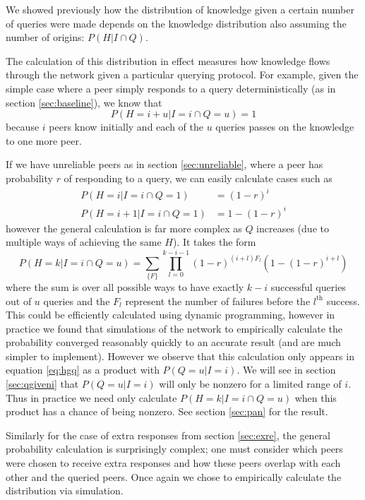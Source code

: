\documentclass{article}
\newcommand{\eqnref}[1]{equation \eqref{eq:#1}}
\newcommand{\secref}[1]{section \ref{sec:#1}}
\begin{document}
We showed previously how the distribution of knowledge given a certain number of
queries were made depends on the knowledge distribution also assuming the number
of origins: $P(H|I\cap Q)$.

The calculation of this distribution in effect measures how knowledge flows
through the network given a particular querying protocol. For example, given
the simple case where a peer simply responds to a query deterministically (as
in \secref{baseline}), we know that
\begin{equation*}
	P(H=i+u|I=i\cap Q=u)=1
\end{equation*}
because $i$ peers know initially and each of the $u$ queries passes on the
knowledge to one more peer.

If we have unreliable peers as in \secref{unreliable}, where a peer has
probability $r$ of responding to a query, we can easily calculate cases such as
\begin{align*}
	P(H=i|I=i\cap Q=1)&=(1-r)^i\\
	P(H=i+1|I=i\cap Q=1)&=1-(1-r)^i
\end{align*}
however the general calculation is far more complex as $Q$ increases (due to
multiple ways of achieving the same $H$). It takes the form
\begin{equation*}
	P(H=k|I=i\cap Q=u)=\sum_{\{F\}}\prod_{l=0}^{k-i-1}(1-r)^{(i+l)F_l}(1-(1-r)^{i+l})
\end{equation*}
where the sum is over all possible ways to have exactly $k-i$ successful queries
out of $u$ queries and the $F_l$ represent the number of failures before the
$l^\text{th}$ success. This could be efficiently calculated using dynamic
programming, however in practice we found that simulations of the
network to empirically calculate the probability converged reasonably quickly to
an accurate result (and are much simpler to implement). However we observe that
this calculation only appears in \eqnref{hgq} as a product with $P(Q=u|I=i)$. We
will see in \secref{qgiveni} that $P(Q=u|I=i)$ will only be nonzero for a
limited range of $i$. Thus in practice we need only calculate $P(H=k|I=i\cap
Q=u)$ when this product has a chance of being nonzero. See \secref{pan} for the
result.

Similarly for the case of extra responses from \secref{exre}, the general
probability calculation is surprisingly complex; one must consider which peers
were chosen to receive extra responses and how these peers overlap with each
other and the queried peers. Once again we chose to empirically calculate the
distribution via simulation.
\end{document}
